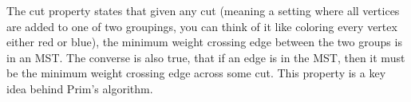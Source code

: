 \question The cut property states that given any cut (meaning a setting where all vertices are added to one of two groupings, you can think of it like coloring every vertex either red or blue), the minimum weight crossing edge between the two groups is in an MST. The converse is also true, that if an edge is in the MST, then it must be the minimum weight crossing edge across some cut. This property is a key idea behind Prim's algorithm.\\
